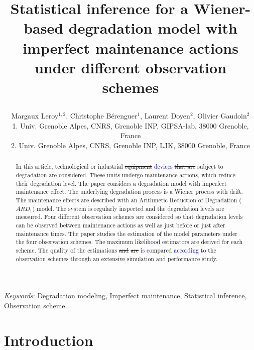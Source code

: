 
\usepackage{soul}



\title{Statistical inference for a Wiener-based degradation model with imperfect maintenance actions under different observation schemes
\author{Margaux {\sc Leroy}$^{1,2}$, Christophe {\sc B\'erenguer}$^{1}$, Laurent {\sc Doyen}$^{2}$, Olivier {\sc Gaudoin}$^{2}$\\
1. Univ. Grenoble Alpes, CNRS, Grenoble INP, GIPSA-lab, 38000 Grenoble, France\\
2. Univ. Grenoble Alpes, CNRS, Grenoble INP, LJK, 38000 Grenoble, France
}}

\maketitle

\begin{abstract}
In this article, technological or industrial \st{equipment} \textcolor{blue}{devices} \st{that are} subject to degradation are considered. These units undergo maintenance actions, which reduce their degradation level.
The paper considers a degradation model with imperfect maintenance effect. The underlying degradation process is a Wiener process with drift. The maintenance effects are described with an Arithmetic Reduction of Degradation ($ARD_1$) model. The system is regularly inspected and the degradation levels are measured.  
Four different observation schemes are considered so that degradation levels can be observed between maintenance actions as well as just before or just after maintenance times.
The paper studies the estimation of the model parameters under the four observation schemes. The maximum likelihood estimators are derived for each scheme.
The quality of the estimations \st{and}  \st{are} \textcolor{blue}{is} compared \textcolor{blue}{according to} the observation schemes through an extensive simulation and performance study.
\end{abstract}

{\it Keywords}: Degradation modeling, Imperfect maintenance, Statistical inference, Observation scheme.


\section{Introduction}
\label{section:intro}

